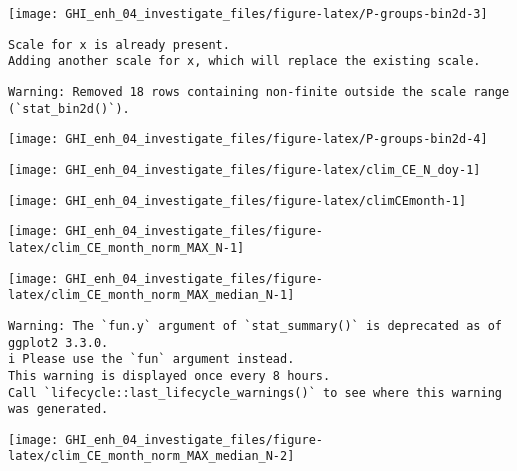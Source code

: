 \documentclass[
  10pt,
  a4paper,oneside]{article}
\begin{document}
\begin{center}\texttt{[image: GHI\_enh\_04\_investigate\_files/figure-latex/P-groups-bin2d-3]} \end{center}

\begin{verbatim}
Scale for x is already present.
Adding another scale for x, which will replace the existing scale.
\end{verbatim}

\begin{verbatim}
Warning: Removed 18 rows containing non-finite outside the scale range
(`stat_bin2d()`).
\end{verbatim}

\begin{center}\texttt{[image: GHI\_enh\_04\_investigate\_files/figure-latex/P-groups-bin2d-4]} \end{center}

\begin{center}\texttt{[image: GHI\_enh\_04\_investigate\_files/figure-latex/clim\_CE\_N\_doy-1]} \end{center}

\begin{center}\texttt{[image: GHI\_enh\_04\_investigate\_files/figure-latex/climCEmonth-1]} \end{center}

\begin{center}\texttt{[image: GHI\_enh\_04\_investigate\_files/figure-latex/clim\_CE\_month\_norm\_MAX\_N-1]} \end{center}

\begin{center}\texttt{[image: GHI\_enh\_04\_investigate\_files/figure-latex/clim\_CE\_month\_norm\_MAX\_median\_N-1]} \end{center}

\begin{verbatim}
Warning: The `fun.y` argument of `stat_summary()` is deprecated as of ggplot2 3.3.0.
i Please use the `fun` argument instead.
This warning is displayed once every 8 hours.
Call `lifecycle::last_lifecycle_warnings()` to see where this warning was generated.
\end{verbatim}

\begin{center}\texttt{[image: GHI\_enh\_04\_investigate\_files/figure-latex/clim\_CE\_month\_norm\_MAX\_median\_N-2]} \end{center}
\end{document}
